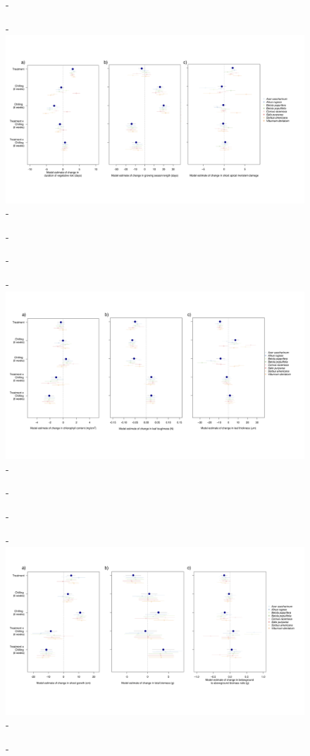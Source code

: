 \documentclass{article}\usepackage[]{graphicx}\usepackage[]{color}
\begin{document}
  {\begin{figure} [H]
  -\begin{center}
  -\includegraphics[width=18cm]{..//analyses/figures/mu_phenandmeri.png} %
  -\end{center}
  -\end{figure}}
  
  {\begin{figure} [H]
  -\begin{center}
  -\includegraphics[width=18cm]{..//analyses/figures/mu_leaftraits.png} %
  -\end{center}
  -\end{figure}}
  
  {\begin{figure} [H]
  -\begin{center}
  -\includegraphics[width=18cm]{..//analyses/figures/mu_growth.png} %
  -\end{center}
  -\end{figure}}
  
  
\end{document}
